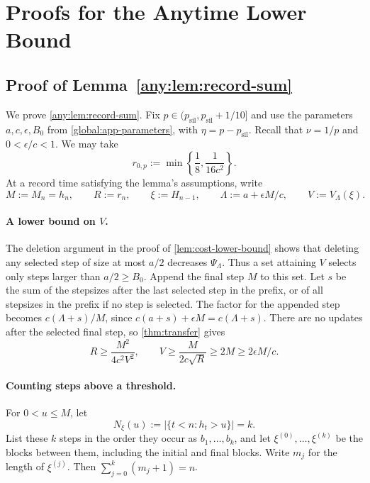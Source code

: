 \documentclass[11pt,letterpaper]{article}
\theoremstyle{definition}
\newcommand{\psil}{p_{\mathrm{sil}}}
\begin{document}
\section{Proofs for the Anytime Lower Bound}
\label{app:anytime}

\subsection{Proof of Lemma~\ref{any:lem:record-sum}}
\label{any:app-record-sum}

We prove \cref{any:lem:record-sum}.
Fix $p\in(\psil,\psil+1/10]$ and use the parameters $a,c,\epsilon,B_0$ from \cref{global:app-parameters}, with $\eta=p-\psil$.
Recall that $\nu=1/p$ and $0<\epsilon/c<1$.
We may take
\[
    r_{0,p}:=\min\left\{\frac18,\frac{1}{16c^2}\right\}.
\]
At a record time satisfying the lemma's assumptions, write
\[
    M:=M_n=h_n,
    \qquad R:=r_n,
    \qquad \xi:=H_{n-1},
    \qquad \Lambda:=a+\epsilon M/c,
    \qquad V:=V_\Lambda(\xi).
\]

\paragraph{A lower bound on $V$.}
The deletion argument in the proof of \cref{lem:cost-lower-bound} shows that deleting any selected step of size at most $a/2$ decreases $\Psi_\Lambda$.
Thus a set attaining $V$ selects only steps larger than $a/2\ge B_0$.
Append the final step $M$ to this set.
Let $s$ be the sum of the stepsizes after the last selected step in the prefix, or of all stepsizes in the prefix if no step is selected. The factor for the appended step becomes $c(\Lambda+s)/M$, since $c(a+s)+\epsilon M=c(\Lambda+s)$.
There are no updates after the selected final step, so \cref{thm:transfer} gives
\begin{equation}
    R\ge\frac{M^2}{4c^2V^2},
    \qquad
    V\ge\frac{M}{2c\sqrt R}\ge2M\ge2\epsilon M/c.
    \label{any:eq:prefix-cost-lower}
\end{equation}

\paragraph{Counting steps above a threshold.}
For $0<u\le M$, let
\[
    N_\xi(u):=\bigl|\{t<n:h_t>u\}\bigr|=k.
\]
List these $k$ steps in the order they occur as $b_1,\ldots,b_k$, and let $\xi^{(0)},\ldots,\xi^{(k)}$ be the blocks between them, including the initial and final blocks.
Write $m_j$ for the length of $\xi^{(j)}$.
Then $\sum_{j=0}^k(m_j+1)=n$.
\end{document}
